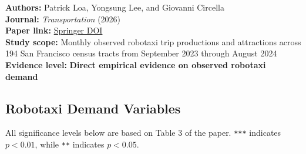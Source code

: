 \documentclass[10pt,a4paper]{article}
\begin{document}
\textbf{Authors:} Patrick Loa, Yongsung Lee, and Giovanni Circella\\
\textbf{Journal:} \emph{Transportation} (2026)\\
\textbf{Paper link:} \href{https://doi.org/10.1007/s11116-026-10751-9}{Springer DOI}\\
\textbf{Study scope:} Monthly observed robotaxi trip productions and attractions across 194 San Francisco census tracts from September 2023 through August 2024\\
\textbf{Evidence level:} \textbf{Direct empirical evidence on observed robotaxi demand}

\hypertarget{robotaxi-demand-variables}{%
\subsection{Robotaxi Demand Variables}\label{robotaxi-demand-variables}}

All significance levels below are based on Table 3 of the paper. \texttt{***} indicates \(p<0.01\), while \texttt{**} indicates \(p<0.05\).
\end{document}
